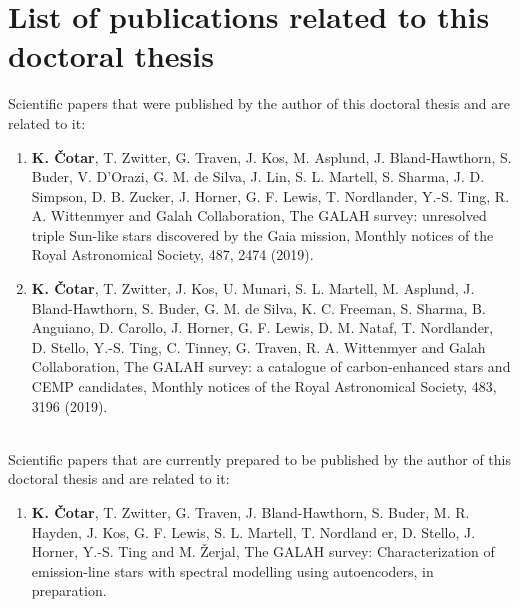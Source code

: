 

\cleardoublepage{}
{}
\chapter*{List of publications related to this doctoral thesis}

Scientific papers that were published by the author of this doctoral thesis and are related to it:
\begin{enumerate}
	\item{\textbf{K. Čotar}, T. Zwitter, G. Traven, J. Kos, M. Asplund, J. Bland-Hawthorn, S. Buder, V. D’Orazi, G. M. de Silva, J. Lin, S. L. Martell, S. Sharma, J. D. Simpson, D. B. Zucker, J. Horner, G. F. Lewis, T. Nordlander, Y.-S. Ting, R. A. Wittenmyer and Galah Collaboration, The GALAH survey: unresolved triple Sun-like stars discovered by the Gaia mission, Monthly notices of the Royal Astronomical Society, 487, 2474 (2019).}
	\item{\textbf{K. Čotar}, T. Zwitter, J. Kos, U. Munari, S. L. Martell, M. Asplund, J. Bland-Hawthorn, S. Buder, G. M. de Silva, K. C. Freeman, S. Sharma, B. Anguiano, D. Carollo, J. Horner, G. F. Lewis, D. M. Nataf, T. Nordlander, D. Stello, Y.-S. Ting, C. Tinney, G. Traven, R. A. Wittenmyer and Galah Collaboration, The	GALAH survey: a catalogue of carbon-enhanced stars and CEMP candidates, Monthly notices of the Royal Astronomical Society, 483, 3196 (2019).}
\end{enumerate}

\ \\ 
\noindent
Scientific papers that are currently prepared to be published by the author of this doctoral thesis and are related to it:
\begin{enumerate}
	\item{\textbf{K. Čotar}, T. Zwitter, G. Traven, J. Bland-Hawthorn, S. Buder, M. R. Hayden, J. Kos, G. F. Lewis, S. L. Martell, T. Nordland er, D. Stello, J. Horner, Y.-S. Ting and M. Žerjal, The GALAH survey: Characterization of emission-line stars with spectral modelling using autoencoders, in preparation.}
\end{enumerate}


